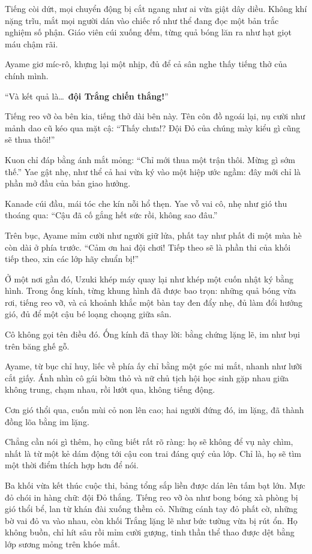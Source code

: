 \documentclass[../main.tex]{subfiles}
\begin{document}
Tiếng còi dứt, mọi chuyển động bị cắt ngang như ai vừa giật dây diều. Không khí nặng trĩu, mắt mọi người dán vào chiếc rổ như thể đang đọc một bản trắc nghiệm số phận. Giáo viên cúi xuống đếm, từng quả bóng lăn ra như hạt giọt máu chậm rãi.

Ayame giơ míc-rô, khựng lại một nhịp, đủ để cả sân nghe thấy tiếng thở của chính mình.

``Và kết quả là\dots\ \textbf{đội Trắng chiến thắng!}''

Tiếng reo vỡ òa bên kia, tiếng thở dài bên này. Tên côn đồ ngoái lại, nụ cười như mảnh dao cũ kéo qua mặt cậ: ``Thấy chưa!? Đội Đỏ của chúng mày kiểu gì cũng sẽ thua thôi!''

Kuon chỉ đáp bằng ánh mắt mỏng: ``Chỉ mới thua một trận thôi. Mừng gì sớm thế.'' Yae gật nhẹ, như thể cả hai vừa ký vào một hiệp ước ngầm: đây mới chỉ là phần mở đầu của bản giao hưởng.

Kanade cúi đầu, mái tóc che kín nỗi hổ thẹn. Yae vỗ vai cô, nhẹ như gió thu thoáng qua: ``Cậu đã cố gắng hết sức rồi, không sao đâu.''

Trên bục, Ayame mỉm cười như người giữ lửa, phất tay như phất đi một mùa hè còn dài ở phía trước. ``Cảm ơn hai đội chơi! Tiếp theo sẽ là phần thi của khối tiếp theo, xin các lớp hãy chuẩn bị!''

Ở một nơi gần đó, Uzuki khép máy quay lại như khép một cuốn nhật ký bằng hình. Trong ống kính, từng khung hình đã được bao trọn: những quả bóng vừa rơi, tiếng reo vỡ, và cả khoảnh khắc một bàn tay đen đẩy nhẹ, đủ làm đổi hướng gió, đủ để một cậu bé loạng choạng giữa sân.

Cô không gọi tên điều đó. Ống kính đã thay lời: bằng chứng lặng lẽ, im như bụi trên băng ghế gỗ.

Ayame, từ bục chỉ huy, liếc về phía ấy chỉ bằng một góc mi mắt, nhanh như lưỡi cắt giấy. Ánh nhìn cô gái bờm thỏ và nữ chủ tịch hội học sinh gặp nhau giữa không trung, chạm nhau, rồi lướt qua, không tiếng động.

Cơn gió thổi qua, cuốn mùi cỏ non lên cao; hai người đứng đó, im lặng, đã thành đồng lõa bằng im lặng.

Chẳng cần nói gì thêm, họ cũng biết rất rõ ràng: họ sẽ không để vụ này chìm, nhất là từ một kẻ dám động tới cậu con trai đáng quý của lớp. Chỉ là, họ sẽ tìm một thời điểm thích hợp hơn để nói.

\ct

Ba khối vừa kết thúc cuộc thi, bảng tổng sắp liền được dán lên tấm bạt lớn. Mực đỏ chói in hàng chữ: đội Đỏ thắng. Tiếng reo vỡ òa như bong bóng xà phòng bị gió thổi bể, lan từ khán đài xuống thềm cỏ. Những cánh tay đỏ phất cờ, những bờ vai đỏ va vào nhau, còn khối Trắng lặng lẽ như bức tường vừa bị rút ổn. Họ không buồn, chỉ hít sâu rồi mỉm cười gượng, tinh thần thể thao được dệt bằng lớp sương mỏng trên khóe mắt.
\end{document}
